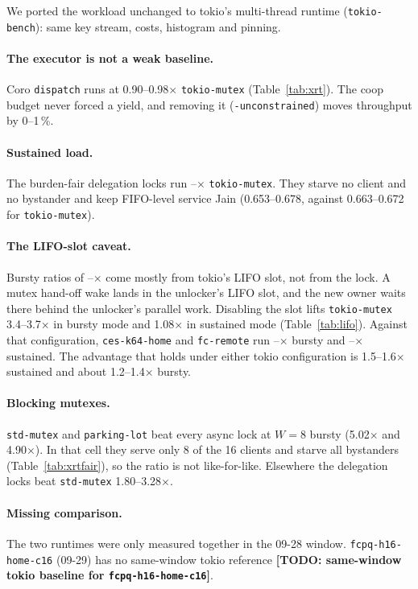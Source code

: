 \documentclass[10pt,twocolumn]{article}
\newcommand{\lk}[1]{\texttt{#1}}
\newcommand{\todo}[1]{{\color{red}\textbf{[TODO: #1]}}}
\begin{document}
We ported the workload unchanged to tokio's multi-thread runtime
(\lk{tokio-bench}): same key stream, costs, histogram and pinning.

\paragraph{The executor is not a weak baseline.} Coro \lk{dispatch} runs at
0.90--0.98$\times$ \lk{tokio-mutex} (Table~\ref{tab:xrt}). The coop budget
never forced a yield, and removing it (\lk{-unconstrained}) moves throughput
by 0--1\,\%.

\paragraph{Sustained load.} The burden-fair delegation locks run
\SusOnLo--\SusOnHi$\times$ \lk{tokio-mutex}. They starve no client and no
bystander and keep FIFO-level service Jain (0.653--0.678, against 0.663--0.672
for \lk{tokio-mutex}).

\paragraph{The LIFO-slot caveat.} Bursty ratios of
\BurOnLo--\BurOnHi$\times$ come mostly from tokio's LIFO slot, not from the
lock. A mutex hand-off wake lands in the unlocker's LIFO slot, and the new
owner waits there behind the unlocker's parallel work. Disabling the slot
lifts \lk{tokio-mutex} 3.4--3.7$\times$ in bursty mode and 1.08$\times$ in
sustained mode (Table~\ref{tab:lifo}). Against that configuration,
\lk{ces-k64-home} and \lk{fc-remote} run \BurOffLo--\BurOffHi$\times$ bursty
and \SusOffLo--\SusOffHi$\times$ sustained. The advantage that holds under
either tokio configuration is 1.5--1.6$\times$ sustained and about
1.2--1.4$\times$ bursty.

\paragraph{Blocking mutexes.} \lk{std-mutex} and \lk{parking-lot} beat every
async lock at $W{=}8$ bursty (5.02$\times$ and 4.90$\times$). In that cell they
serve only 8 of the 16 clients and starve all bystanders
(Table~\ref{tab:xrtfair}), so the ratio is not like-for-like. Elsewhere the
delegation locks beat \lk{std-mutex} 1.80--3.28$\times$.

\paragraph{Missing comparison.} The two runtimes were only measured together
in the 09-28 window. \lk{fcpq-h16-home-c16} (09-29) has no same-window tokio
reference \todo{same-window tokio baseline for \lk{fcpq-h16-home-c16}}.
\end{document}
